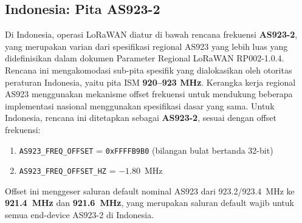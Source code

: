 \subsection{Indonesia: Pita AS923-2}
\label{subsec:indonesia_as923}
Di Indonesia, operasi LoRaWAN diatur di bawah rencana frekuensi \textbf{AS923-2}, yang merupakan varian dari spesifikasi regional AS923 yang lebih luas yang didefinisikan dalam dokumen Parameter Regional LoRaWAN RP002-1.0.4. Rencana ini mengakomodasi sub-pita spesifik yang dialokasikan oleh otoritas peraturan Indonesia, yaitu pita ISM \textbf{920–923 MHz}.
Kerangka kerja regional AS923 menggunakan mekanisme offset frekuensi untuk mendukung beberapa implementasi nasional menggunakan spesifikasi dasar yang sama. Untuk Indonesia, rencana ini ditetapkan sebagai \textbf{AS923-2}, sesuai dengan offset frekuensi:
\begin{enumerate}
    \item \texttt{AS923\_FREQ\_OFFSET} = \texttt{0xFFFFB9B0} (bilangan bulat bertanda 32-bit)
    \item \texttt{AS923\_FREQ\_OFFSET\_HZ} = $-1.80$~MHz
\end{enumerate}
Offset ini menggeser saluran default nominal AS923 dari 923.2/923.4~MHz ke \textbf{921.4~MHz} dan \textbf{921.6~MHz}, yang merupakan saluran default wajib untuk semua end-device AS923-2 di Indonesia.
